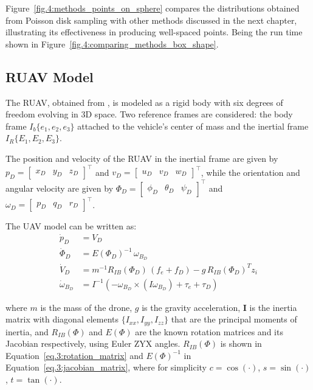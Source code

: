 Figure~\ref{fig.4:methods_points_on_sphere} compares the distributions obtained from Poisson disk sampling with other methods discussed in the next chapter, illustrating its effectiveness in producing well-spaced points. Being the run time shown in Figure~\ref{fig.4:comparing_methods_box_shape}.

\subsection{RUAV Model}
\label{sec.3:ruav_model}

The \gls{RUAV}, obtained from \cite{AlexandraGonalvesRodrigues2023}, is modeled as a rigid body with six
degrees of freedom evolving in \gls{3D} space. Two reference frames are
considered: the body frame $I_b\{e_1, e_2, e_3\}$ attached
to the vehicle's center of mass and the inertial frame $I_R\{E_1, E_2, E_3\}$.

The position and velocity of the RUAV in the inertial frame are given by
$p_D = \begin{bmatrix} x_D & y_D & z_D \end{bmatrix}^\top$
and
$v_D = \begin{bmatrix} u_D & v_D & w_D \end{bmatrix}^\top$,
while the orientation and angular velocity are given by
$\Phi_D = \begin{bmatrix} \phi_D & \theta_D & \psi_D \end{bmatrix}^\top$
and
$\omega_D = \begin{bmatrix} p_D & q_D & r_D \end{bmatrix}^\top$.

The \gls{UAV} model can be written as:
\begin{align}
\dot{p}_D &= V_D \\
\dot{\Phi}_D &= E(\Phi_D)^{-1}\,\omega_{B_D} \\
\dot{V}_D &= m^{-1} R_{IB}(\Phi_D)\,(f_e + f_D) - g\, R_{IB}(\Phi_D)^{T} z_i \\
\dot{\omega}_{B_D} &= I^{-1}\!\left(-\omega_{B_D} \times (I \omega_{B_D}) + \tau_e + \tau_D \right)
\end{align}

where $m$ is the mass of the drone, $g$ is the gravity acceleration, $\mathbf{I}$ is the inertia
matrix with diagonal elements $\{I_{xx}, I_{yy}, I_{zz}\}$ that are the principal moments of inertia,
and $R_{IB}(\Phi)$ and $E(\Phi)$ are the known rotation matrices and its Jacobian respectively,
using Euler ZYX angles. $R_{IB}(\Phi)$ is shown in Equation~\ref{eq.3:rotation_matrix} and $E(\Phi)^{-1}$ in
Equation~\ref{eq.3:jacobian_matrix}, where for simplicity $c=\cos(\cdot)$, $s=\sin(\cdot)$, $t=\tan(\cdot)$.

